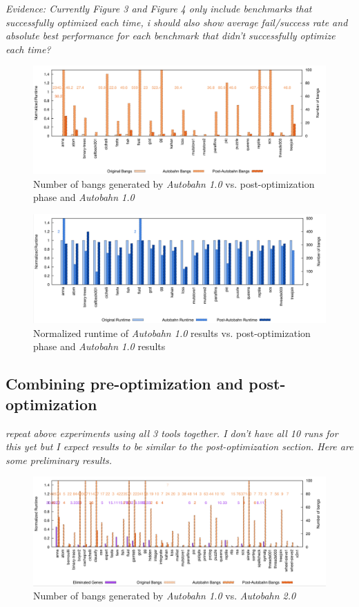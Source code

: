 \documentclass[format=sigplan]{acmart}
\newcommand{\Ao}[0]{\textit{Autobahn 1.0}}
\newcommand{\At}[0]{\textit{Autobahn 2.0}}
\newcommand{\preopt}[0]{pre-optimization}
\newcommand{\postopt}[0]{post-optimization}
\begin{document}
\textit{Evidence: Currently Figure 3 and Figure 4 only include benchmarks that successfully optimized each time, i should also show average fail/success rate and absolute best performance for each benchmark that didn't successfully optimize each time?}

\begin{figure}
\includegraphics[width=\textwidth]{autPost1}
\caption{Number of bangs generated by \Ao{} vs. \postopt{} phase and \Ao{}}
\end{figure}

\begin{figure}
\includegraphics[width=\textwidth]{autPost2}
\caption{Normalized runtime of \Ao{} results vs. \postopt{} phase and \Ao{} results}
\end{figure}

\subsection{Combining \preopt{} and \postopt{}}

\textit{repeat above experiments using all 3 tools together. I don't have all 10 runs for this yet but I expect results to be similar to the \postopt{} section. Here are some preliminary results.}

\begin{figure}
\includegraphics[width=\textwidth]{pap}
\caption{Number of bangs generated by \Ao{} vs. \At{}}
\end{figure}
\end{document}
